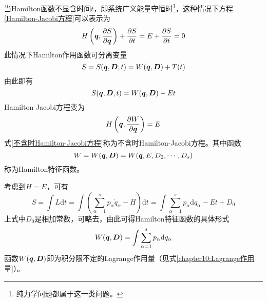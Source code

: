 当Hamilton函数不显含时间$t$，即系统广义能量守恒时\footnote{纯力学问题都属于这一类问题。}，这种情况下方程\eqref{Hamilton-Jacobi方程}可以表示为
\begin{equation}
	H\left(\boldsymbol{q},\frac{\partial S}{\partial \boldsymbol{q}}\right) + \frac{\partial S}{\partial t} = E + \frac{\partial S}{\partial t} = 0
\end{equation}
此情况下Hamilton作用函数可分离变量
\begin{equation*}
	S = S(\boldsymbol{q},\boldsymbol{D},t) = W(\boldsymbol{q},\boldsymbol{D}) + T(t)
\end{equation*}
由此即有
\begin{equation}
	S(\boldsymbol{q},\boldsymbol{D},t) = W(\boldsymbol{q},\boldsymbol{D}) - Et
\end{equation}
Hamilton-Jacobi方程变为
\begin{equation}
	H\left(\boldsymbol{q},\frac{\partial W}{\partial \boldsymbol{q}}\right) = E
	\label{不含时Hamilton-Jacobi方程}
\end{equation}
式\eqref{不含时Hamilton-Jacobi方程}称为{\heiti 不含时Hamilton-Jacobi方程}。其中函数
\begin{equation*}
	W = W(\boldsymbol{q},\boldsymbol{D}) = W(\boldsymbol{q},E,D_2,\cdots,D_s)
\end{equation*}
称为{\heiti Hamilton特征函数}。

考虑到$H=E$，可有
\begin{equation*}
	S = \int L \mathrm{d} t = \int \left(\sum_{\alpha=1}^s p_\alpha \dot{q}_\alpha - H\right) \mathrm{d} t = \int \sum_{\alpha=1}^s p_\alpha \mathrm{d} q_\alpha - Et + D_0
\end{equation*}
上式中$D_0$是相加常数，可略去，由此可得Hamilton特征函数的具体形式
\begin{equation}
	W(\boldsymbol{q},\boldsymbol{D}) = \int \sum_{\alpha=1}^s p_\alpha \mathrm{d} q_\alpha
\end{equation}
函数$W(\boldsymbol{q},\boldsymbol{D})$即为积分限不定的Lagrange作用量（见式\eqref{chapter10:Lagrange作用量}）。


